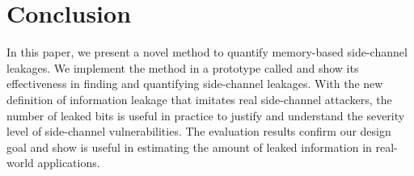 \section{Conclusion}
In this paper, we present a novel  %
method to
quantify memory-based side-channel leakages. We implement the method in
a prototype called \tool{} and show its effectiveness in finding
and quantifying side-channel leakages. With the new definition of
information leakage that imitates real side-channel attackers, the number of
leaked bits is useful in practice to justify and understand the severity level
of side-channel vulnerabilities. The evaluation results confirm our design goal
and show \tool{} is useful in estimating the amount of leaked information in
real-world applications.

